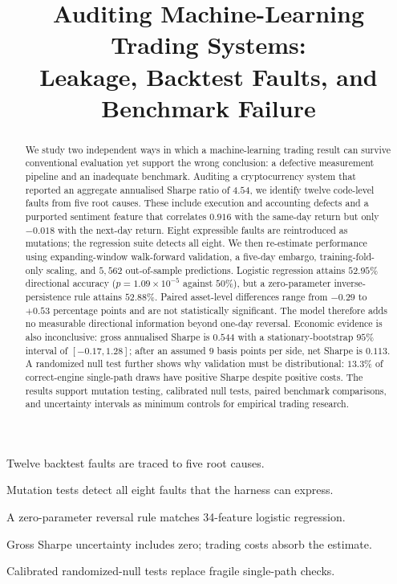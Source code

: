 \documentclass[preprint,12pt,authoryear]{elsarticle}
\begin{document}
\begin{frontmatter}

\title{Auditing Machine-Learning Trading Systems:\\
       Leakage, Backtest Faults, and Benchmark Failure}

\author{}

\begin{abstract}
We study two independent ways in which a machine-learning trading result can
survive conventional evaluation yet support the wrong conclusion: a defective
measurement pipeline and an inadequate benchmark. Auditing a cryptocurrency
system that reported an aggregate annualised Sharpe ratio of $4.54$, we identify
twelve code-level faults from five root causes. These include execution and
accounting defects and a purported sentiment feature that correlates $0.916$
with the same-day return but only $-0.018$ with the next-day return. Eight
expressible faults are reintroduced as mutations; the regression suite detects
all eight. We then re-estimate performance using expanding-window walk-forward
validation, a five-day embargo, training-fold-only scaling, and $5{,}562$
out-of-sample predictions. Logistic regression attains $52.95\%$ directional
accuracy ($p=1.09\times10^{-5}$ against $50\%$), but a zero-parameter inverse-
persistence rule attains $52.88\%$. Paired asset-level differences range from
$-0.29$ to $+0.53$ percentage points and are not statistically significant.
The model therefore adds no measurable directional information beyond one-day
reversal. Economic evidence is also inconclusive: gross annualised Sharpe is
$0.544$ with a stationary-bootstrap $95\%$ interval of $[-0.17,1.28]$; after an
assumed $9$ basis points per side, net Sharpe is $0.113$. A randomized null test
further shows why validation must be distributional: $13.3\%$ of correct-engine
single-path draws have positive Sharpe despite positive costs. The results
support mutation testing, calibrated null tests, paired benchmark comparisons,
and uncertainty intervals as minimum controls for empirical trading research.
\end{abstract}

\begin{highlights}
\item Twelve backtest faults are traced to five root causes.
\item Mutation tests detect all eight faults that the harness can express.
\item A zero-parameter reversal rule matches 34-feature logistic regression.
\item Gross Sharpe uncertainty includes zero; trading costs absorb the estimate.
\item Calibrated randomized-null tests replace fragile single-path checks.
\end{highlights}


\end{frontmatter}
\end{document}
